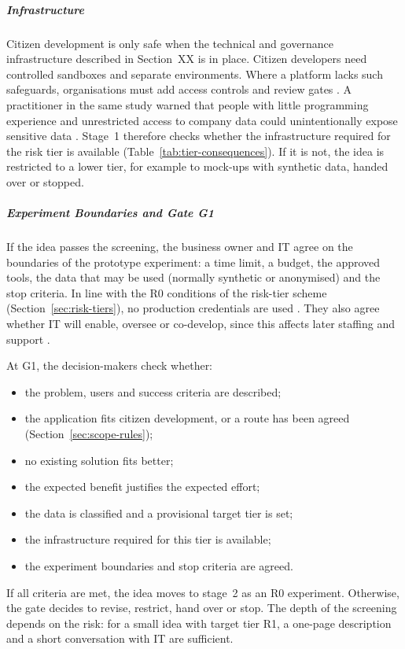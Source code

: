 \documentclass[10pt,a4paper]{article}
\begin{document}
\subparagraph{Infrastructure}

Citizen development is only safe when the technical and governance infrastructure described in Section~XX is in place. Citizen developers need controlled sandboxes and separate environments. Where a platform lacks such safeguards, organisations must add access controls and review gates \parencite{viljoen2024}. A practitioner in the same study warned that people with little programming experience and unrestricted access to company data could unintentionally expose sensitive data \parencite{viljoen2024}. Stage~1 therefore checks whether the infrastructure required for the risk tier is available (Table~\ref{tab:tier-consequences}). If it is not, the idea is restricted to a lower tier, for example to mock-ups with synthetic data, handed over or stopped.


\subparagraph{Experiment Boundaries and Gate G1}

If the idea passes the screening, the business owner and IT agree on the boundaries of the prototype experiment: a time limit, a budget, the approved tools, the data that may be used (normally synthetic or anonymised) and the stop criteria. In line with the R0 conditions of the risk-tier scheme
(Section~\ref{sec:risk-tiers}), no production credentials are used
\parencite{koch2026agentic}. They also agree whether IT will enable, oversee or co-develop, since this affects later staffing and support \parencite{viljoen2024}.

At G1, the decision-makers check whether:

\begin{itemize}
    \item the problem, users and success criteria are described;
    \item the application fits citizen development, or a route has
    been agreed (Section~\ref{sec:scope-rules});
    \item no existing solution fits better;
    \item the expected benefit justifies the expected effort;
    \item the data is classified and a provisional target tier is set;
    \item the infrastructure required for this tier is available;
    \item the experiment boundaries and stop criteria are agreed.
\end{itemize}

If all criteria are met, the idea moves to stage~2 as an R0 experiment. Otherwise, the gate decides to revise, restrict, hand over or stop. The depth of the screening depends on the risk: for a small idea with target tier R1, a one-page description and a short conversation with IT are sufficient.
\end{document}

